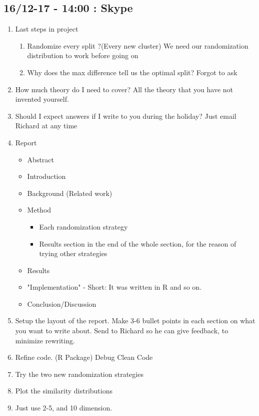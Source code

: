 \documentclass[a4paper,10pt]{article}
\begin{document}
\newpage
\subsection{16/12-17 - 14:00 : Skype}

\begin{enumerate}
	\item Last steps in project
		\begin{enumerate}
			\item Randomize every split ?(Every new cluster)
				\subitem We need our randomization distribution to work before going on
			\item Why does the max difference tell us the optimal split?
				\subitem Forgot to ask
		\end{enumerate}
	\item How much theory do I need to cover? 
		\subitem All the theory that you have not invented yourself.
	\item Should I expect answers if I write to you during the holiday?
		\subitem Just email Richard at any time
	
	\item Report
		\begin{itemize}
			\item Abstract
			\item Introduction
			\item Background (Related work)
			\item Method
				\begin{itemize}
					\item Each randomization strategy
					\item Results section in the end of the whole section, for the reason of trying other strategies
				\end{itemize}
			\item Results
			\item "Implementation"
				\subitem - Short: It was written in R and so on.
			\item Conclusion/Discussion
		\end{itemize}
		
	\item Setup the layout of the report. Make 3-6 bullet points in each section on what you want to write about.
		\subitem Send to Richard so he can give feedback, to minimize rewriting.
	
	\item Refine code. (R Package)
		\subitem Debug
		\subitem Clean Code
	
	\item Try the two new randomization strategies
	\item Plot the similarity distributions
	\item Just use 2-5, and 10 dimension.
\end{enumerate}
\end{document}
